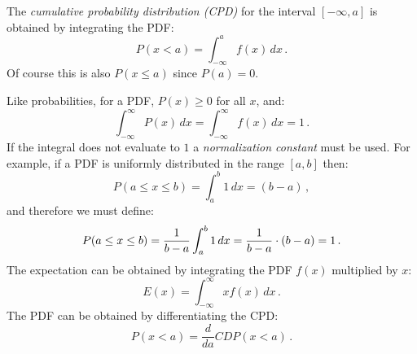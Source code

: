 The \emph{cumulative probability distribution (CPD)} for the interval $[-\infty,a]$ is obtained by integrating the PDF:
\[
P(x<a) = \int_{-\infty}^{a} f(x)\, dx\,.
\]
Of course this is also $P(x\leq a)$ since $P(a)=0$.

Like probabilities, for a PDF, $P(x)\geq 0$ for all $x$, and:
\[
\int_{-\infty}^{\infty} P(x)\, dx=\int_{-\infty}^{\infty} f(x)\, dx=1\,.
\]
If the integral does not evaluate to $1$ a \emph{normalization constant} must be used. For example, if a PDF is uniformly distributed in the range $[a,b]$ then:
\[
P(a\leq x \leq b)=\int_{a}^{b} 1\, dx=(b-a)\,,
\]
and therefore we must define:
\[
P(a\leq x \leq b)=\displaystyle\frac{1}{b-a}\int_{a}^{b} 1\, dx=\displaystyle\frac{1}{b-a}\cdot (b-a)=1\,.
\]
The expectation can be obtained by integrating the PDF $f(x)$ multiplied by $x$:
\[
E(x)=\int_{-\infty}^{\infty} xf(x)\, dx\,.
\]
The PDF can be obtained by differentiating the CPD:
\[
P(x<a)= \frac{d}{da}\mathit{CDP}(x<a)\,.
\]

